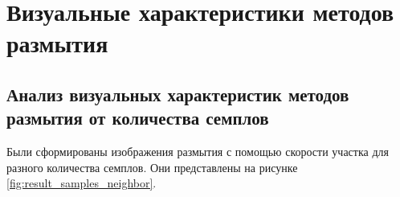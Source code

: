 \section{Визуальные характеристики методов размытия}

\subsection{Анализ визуальных характеристик методов размытия от количества семплов}

Были сформированы изображения размытия с помощью скорости участка для разного количества семплов. Они представлены на рисунке \ref{fig:result_samples_neighbor}.

\begin{figure}[h]
    \centering
    \begin{minipage}[h]{0.45\linewidth}
    \end{minipage}
    \hfill
    \begin{minipage}[h]{0.45\linewidth}
    \end{minipage}
    


\end{figure}
